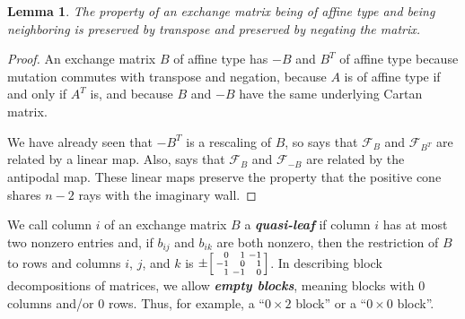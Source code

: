 \documentclass{amsart}
\newtheorem{lemma}[proposition]{Lemma}
\theoremstyle{definition}
\theoremstyle{remark}
\numberwithin{equation}{section}
\newcommand{\newword}[1]{\textbf{\emph{#1}}}
\newcommand{\F}{{\mathcal F}}
\newcommand{\0}{{\mathbf{0}}}
\begin{document}
\begin{lemma}\label{neigh neg and T}
The property of an exchange matrix being of affine type and being neighboring is preserved by transpose and preserved by negating the matrix.
\end{lemma}
\begin{proof}
An exchange matrix $B$ of affine type has $-B$ and $B^T$ of affine type because mutation commutes with transpose and negation, because $A$ is of affine type if and only if $A^T$ is, and because $B$ and $-B$ have the same underlying Cartan matrix.

We have already seen that $-B^T$ is a rescaling of $B$, so \cite[Proposition~7.8(3)]{universal} says that $\F_B$ and $\F_{B^T}$ are related by a linear map.
Also, \cite[Proposition~7.1]{universal} says that $\F_B$ and $\F_{-B}$ are related by the antipodal map.
These linear maps preserve the property that the positive cone shares $n-2$ rays with the imaginary wall.
\end{proof}

We call column $i$ of an exchange matrix $B$ a \newword{quasi-leaf} if column $i$ has at most two nonzero entries and, if $b_{ij}$ and $b_{ik}$ are both nonzero, then the restriction of $B$ to rows and columns $i$, $j$, and $k$ is $\pm\begin{bsmallmatrix*}[r]0&1&-1\\-1&0&1\\1&-1&0\end{bsmallmatrix*}$.
In describing block decompositions of matrices, we allow \newword{empty blocks}, meaning blocks with $0$ columns and/or $0$ rows.
Thus, for example, a ``$0\times 2$ block'' or a ``$0\times 0$ block''.
\end{document}
